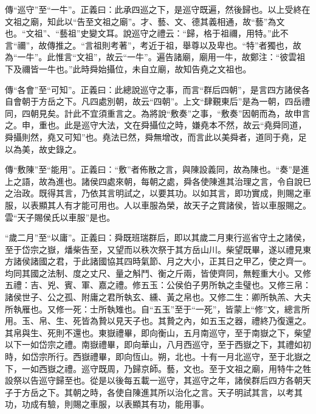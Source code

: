 {\noindent\zhuan{}\fzbyks 傳“巡守”至“一牛”。正義曰：此承四巡之下，是巡守既遍，然後歸也。以上受終在文祖之廟，知此以“告至文祖之廟”。才、藝、文、德其義相通，故“藝”為文也。“文祖”、“藝祖”史變文耳。說巡守之禮云：“歸，格于祖禰，用特。”此不言“禰”，故傳推之。“言祖則考著”，考近于祖，舉尊以及卑也。“特”者獨也，故為“一牛”。此惟言“文祖”，故云“一牛”。遍告諸廟，廟用一牛，故鄭注：“彼雲祖下及禰皆一牛也。”此時舜始攝位，未自立廟，故知告堯之文祖也。 \par}

{\noindent\zhuan{}\fzbyks 傳“各會”至“可知”。正義曰：此總說巡守之事，而言“群后四朝”，是言四方諸侯各自會朝于方岳之下。凡四處別朝，故云“四朝”。上文“肆覲東后”是為一朝，四岳禮同，四朝見矣。計此不宜須重言之。為將說“敷奏”之事，“敷奏”因朝而為，故申言之。申，重也。此是巡守大法，文在舜攝位之時，嫌堯本不然，故云“堯舜同道，舜攝則然，堯又可知”也。堯法已然，舜無增改，而言此以美舜者，道同于堯，足以為美，故史錄之。 \par}

{\noindent\zhuan{}\fzbyks 傳“敷陳”至“能用”。正義曰：“敷”者佈散之言，與陳設義同，故為陳也。“奏”是進上之語，故為進也。諸侯四處來朝，每朝之處，舜各使陳進其治理之言，令自說巳之治政。既得其言，乃依其言明試之，以要其功。以如其言，即功實成，則賜之車服，以表顯其人有才能可用也。人以車服為榮，故天子之賞諸侯，皆以車服賜之。雲“天子賜侯氏以車服”是也。 \par}

{\noindent\shu{}\fzkt “歲二月”至“以庸”。正義曰：舜既班瑞群后，即以其歲二月東行巡省守土之諸侯，至于岱宗之嶽，燔柴告至，又望而以秩次祭于其方岳山川。柴望既畢，遂以禮見東方諸侯諸國之君，于此諸國協其四時氣節、月之大小，正其日之甲乙，使之齊一。均同其國之法制、度之丈尺、量之斛鬥、衡之斤兩，皆使齊同，無輕重大小。又修五禮：吉、兇、賓、軍、嘉之禮。修五玉：公侯伯子男所執之圭璧也。又修三帛：諸侯世子、公之孤、附庸之君所執玄、纁、黃之帛也。又修二生：卿所執羔、大夫所執雁也。又修一死：士所執雉也。自“五玉”至于“一死”，皆蒙上“修”文，總言所用。玉、帛、生、死皆為贄以見天子也。其贄之內，如五玉之器，禮終乃復還之。其帛與生、死則不還也。東嶽禮畢，即向衡山，五月南巡守，至于南嶽之下，柴望以下一如岱宗之禮。南嶽禮畢，即向華山，八月西巡守，至于西嶽之下，其禮如初時，如岱宗所行。西嶽禮畢，即向恆山。朔，北也。十有一月北巡守，至于北嶽之下，一如西嶽之禮。巡守既周，乃歸京師。藝，文也。至于文祖之廟，用特牛之牲設祭以告巡守歸至也。從是以後每五載一巡守，其巡守之年，諸侯群后四方各朝天子于方岳之下。其朝之時，各使自陳進其所以治化之言。天子明試其言，以考其功，功成有驗，則賜之車服，以表顯其有功，能用事。 \par}

